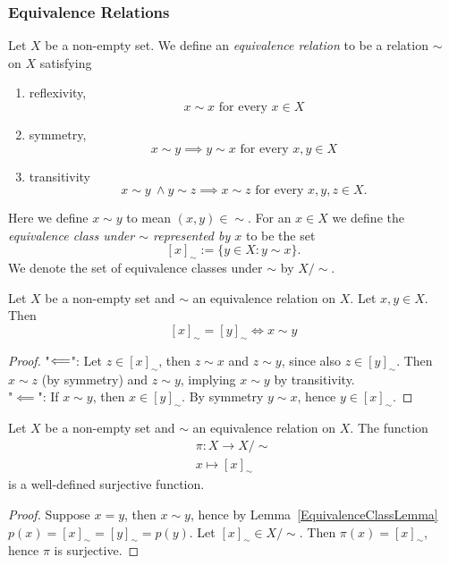 \subsubsection{Equivalence Relations}
\begin{definition}
    Let $X$ be a non-empty set. We define an \textit{equivalence relation} to be a relation $\sim$ on $X$ satisfying 
    \begin{enumerate}
        \item reflexivity,
        $$x\sim x \text{ for every } x \in X$$
        \item symmetry,
        $$x \sim y \implies y\sim x \text{ for every } x,y\in X$$
        \item transitivity
        $$x \sim y\ \wedge y\sim z \implies x\sim z \text{ for every } x,y,z\in X.$$
    \end{enumerate}
    Here we define $x\sim y$ to mean $(x,y)\in \sim$. For an $x\in X$ we define the \textit{equivalence class under $\sim$ represented by $x$} to be the set 
    $$[x]_\sim:= \{y\in X : y\sim x\}.$$
    We denote the set of equivalence classes under $\sim$ by $X/\sim$.
\end{definition}
\begin{lemma}\label{EquivalenceClassLemma}
    Let $X$ be a non-empty set and $\sim$ an equivalence relation on $X$. Let $x,y\in X$. Then 
    $$[x]_\sim = [y]_\sim \iff x\sim y$$
\end{lemma}
\begin{proof}
    "$\Longleftarrow$": Let $z\in [x]_\sim$, then $z\sim x$ and $z\sim y$, since also $z\in [y]_\sim$. Then $x\sim z$ (by symmetry) and $z\sim y$, implying $x\sim y$ by transitivity.\\
    "$\impliedby$": If $x\sim y$, then $x\in [y]_\sim$. By symmetry $y\sim x$, hence $y\in [x]_\sim$. 
\end{proof}
\begin{lemma}\label{CanonicalSurjection}
    Let $X$ be a non-empty set and $\sim$ an equivalence relation on $X$. The function
    \begin{gather*}
        \pi : X\rightarrow X/\sim\\
        x\mapsto [x]_\sim
    \end{gather*}
    is a well-defined surjective function.
\end{lemma}
\begin{proof}
    Suppose $x=y$, then $x\sim y$, hence by Lemma~\ref{EquivalenceClassLemma} $p(x)=[x]_\sim=[y]_\sim=p(y)$. Let $[x]_\sim \in X/\sim$. Then $\pi(x) =[x]_\sim$, hence $\pi$ is surjective.
\end{proof}

